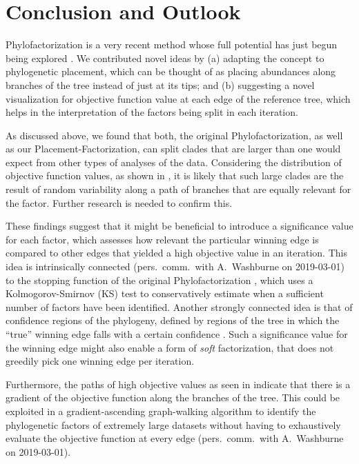 \section{Conclusion and Outlook}
\label{ch:Factorization:sec:ConclusionOutlook}

Phylofactorization is a very recent method whose full potential has just begun being explored \cite{Washburne2019}.
We contributed novel ideas by
(a) adapting the concept to phylogenetic placement,
which can be thought of as placing abundances along branches of the tree instead of just at its tips;
and (b) suggesting a novel visualization for objective function value at each edge of the reference tree,
which helps in the interpretation of the factors being split in each iteration.

As discussed above, we found that both, the original Phylofactorization, as well as our Placement-Factorization,
can split clades that are larger than one would expect from other types of analyses of the data.
Considering the distribution of objective function values, as shown in ,
it is likely that such large clades are the result of random variability
along a path of branches that are equally relevant for the factor.
Further research is needed to confirm this.

These findings suggest that it might be beneficial to introduce a significance value for each factor,
which assesses how relevant the particular winning edge is
compared to other edges that yielded a high objective value in an iteration.
This idea is intrinsically connected (pers.~comm.~with A.~Washburne on 2019-03-01)
to the stopping function of the original Phylofactorization \cite{Washburne2017a},
which uses a Kolmogorov-Smirnov (KS) test %
to conservatively estimate when a sufficient number of factors have been identified.
Another strongly connected idea is that of confidence regions of the phylogeny,
defined by regions of the tree in which the ``true'' winning edge falls with a certain confidence \cite{Washburne2019}.
Such a significance value for the winning edge might also enable a form of \emph{soft} factorization,
that does not greedily pick one winning edge per iteration.

Furthermore, the paths of high objective values as seen in  indicate
that there is a gradient of the objective function along the branches of the tree.
This could be exploited in a gradient-ascending graph-walking algorithm to identify the phylogenetic factors
of extremely large datasets without having to exhaustively evaluate the objective function at every edge
(pers.~comm.~with A.~Washburne on 2019-03-01).

